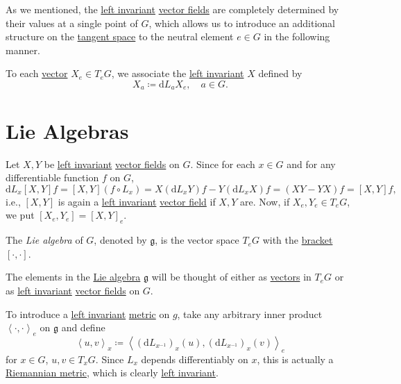 As we mentioned, the \hyperref[def:vector-field-left-invariant]{left invariant} \hyperref[def:vector-field]{vector fields} are completely determined by their values at a single point of \(G\), which allows us to introduce an additional structure on the \hyperref[def:tangent-space]{tangent space} to the neutral element \(e\in G\) in the following manner.

To each \hyperref[def:tangent-vector]{vector} \(X_e\in T_e G\), we associate the \hyperref[def:vector-field-left-invariant]{left invariant} \(X\) defined by
\[
	X_a \coloneqq \mathrm{d} L_a X_e,\quad a\in G.
\]

\section{Lie Algebras}
Let \(X, Y\) be \hyperref[def:vector-field-left-invariant]{left invariant} \hyperref[def:vector-field]{vector fields} on \(G\). Since for each \(x\in G\) and for any differentiable function \(f\) on \(G\),
\[
	\mathrm{d} L_x [X, Y] f = [X, Y](f \circ L_x) = X(\mathrm{d} L_x Y) f - Y(\mathrm{d} L_x X) f = (XY - YX) f = [X, Y]f,
\]
i.e., \([X, Y]\) is again a \hyperref[def:vector-field-left-invariant]{left invariant} \hyperref[def:vector-field]{vector field} if \(X, Y\) are. Now, if \(X_e, Y_e\in T_e G\), we put \([X_e, Y_e] = [X, Y]_e\).

\begin{definition}\label{def:Lie-algebra}
	The \emph{Lie algebra} of \(G\), denoted by \(\mathfrak{g}\), is the vector space \(T_e G\) with the \hyperref[def:bracket]{bracket} \([\cdot, \cdot]\).
\end{definition}

\begin{note}
	The elements in the \hyperref[def:Lie-algebra]{Lie algebra} \(\mathfrak{g}\) will be thought of either as \hyperref[def:tangent-vector]{vectors} in \(T_e G\) or as \hyperref[def:vector-field-left-invariant]{left invariant} \hyperref[def:vector-field]{vector fields} on \(G\).
\end{note}

To introduce a \hyperref[def:Riemannian-metric-left-invariant]{left invariant} \hyperref[def:Riemannian-metric]{metric} on \(g\), take any arbitrary inner product \(\left\langle \cdot, \cdot \right\rangle _e\) on \(\mathfrak{g} \) and define
\begin{equation}\label{eq:inner-product-on-Lie-algebra}
	\left\langle u, v \right\rangle _x \coloneqq \left\langle (\mathrm{d} L_{x ^{-1} })_x(u), (\mathrm{d} L_{x ^{-1} })_x(v) \right\rangle _e
\end{equation}
for \(x\in G\), \(u, v\in T_x G\). Since \(L_x\) depends differentiably on \(x\), this is actually a \hyperref[def:Riemannian-metric]{Riemannian metric}, which is clearly \hyperref[def:Riemannian-metric-left-invariant]{left invariant}.

